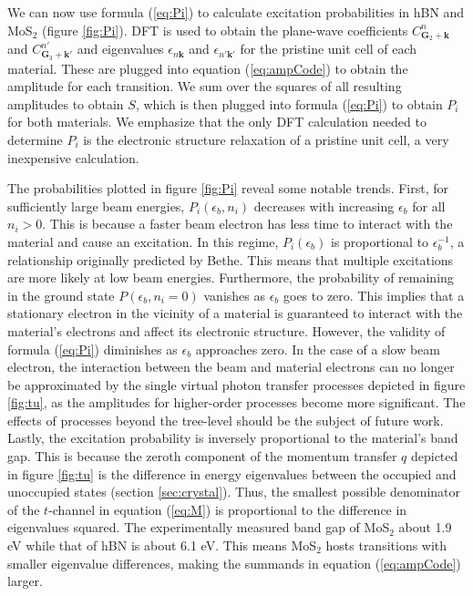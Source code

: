 \documentclass{article}
\begin{document}
We can now use formula (\ref{eq:Pi}) to calculate excitation probabilities in
hBN and MoS$_2$ (figure \ref{fig:Pi}).
DFT is used to obtain the plane-wave coefficients $C_{\mathbf{G}_2
+\mathbf{k}}^n$ and $C_{\mathbf{G}_3+\mathbf{k'}}^{n'}$ and eigenvalues
$\epsilon_{n\mathbf{k}}$ and $\epsilon_{n'\mathbf{k'}}$ for the pristine unit
cell of each material.
These are plugged into equation (\ref{eq:ampCode}) to obtain the amplitude for
each transition.
We sum over the squares of all resulting amplitudes to obtain $S$, which is
then plugged into formula (\ref{eq:Pi}) to obtain $P_i$ for both materials.
We emphasize that the only DFT calculation needed to determine $P_i$ is the
electronic structure relaxation of a pristine unit cell, a very inexpensive
calculation.

The probabilities plotted in figure \ref{fig:Pi} reveal some notable
trends.
First, for sufficiently large beam energies, $P_i(\epsilon_b, n_i)$ decreases
with increasing $\epsilon_b$ for all $n_i>0$.
This is because a faster beam electron has less time to interact with the
material and cause an excitation.
In this regime, $P_i(\epsilon_b)$ is proportional to $\epsilon_b^{-1}$, a
relationship originally predicted by Bethe.\cite{Bethe1930, Inokuti1967,
Kretschmer2020}
This means that multiple excitations are more likely at low beam energies.
Furthermore, the probability of remaining in the ground state $P(\epsilon_b,
n_i=0)$ vanishes as $\epsilon_b$ goes to zero.
This implies that a stationary electron in the vicinity of a material is
guaranteed to interact with the material's electrons and affect its electronic
structure.
However, the validity of formula (\ref{eq:Pi}) diminishes as $\epsilon_b$
approaches zero.
In the case of a slow beam electron, the interaction between the beam and
material electrons can no longer be approximated by the single virtual photon
transfer processes depicted in figure \ref{fig:tu}, as the amplitudes for
higher-order processes become more significant.
The effects of processes beyond the tree-level should be the subject of future
work.
Lastly, the excitation probability is inversely proportional to the material's
band gap.
This is because the zeroth component of the momentum transfer $q$ depicted in
figure \ref{fig:tu} is the difference in energy eigenvalues between the
occupied and unoccupied states (section \ref{sec:crystal}).
Thus, the smallest possible denominator of the $t$-channel in equation
(\ref{eq:M}) is proportional to the difference in eigenvalues squared.
The experimentally measured band gap of MoS$_2$ about 1.9 eV \cite{Gusakova2017}
while that of hBN is about 6.1 eV.\cite{Elias2019}
This means MoS$_2$ hosts transitions with smaller eigenvalue differences,
making the summands in equation (\ref{eq:ampCode}) larger.
\end{document}
